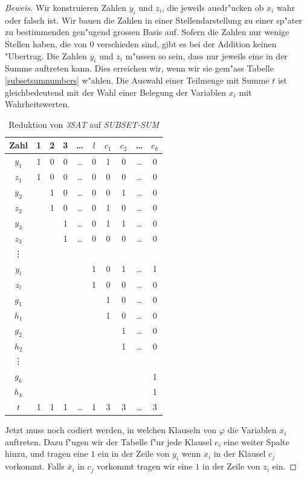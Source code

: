 \begin{proof}[Beweis]
Wir konstruieren Zahlen $y_i$ und $z_i$, die jeweils ausdr"ucken
ob $x_i$ wahr oder falsch ist. Wir bauen die Zahlen in einer
Stellendarstellung zu einer sp"ater zu bestimmenden gen"ugend
grossen Basis auf. Sofern die Zahlen nur wenige Stellen haben, die 
von $0$ verschieden sind, gibt es bei der Addition keinen "Ubertrag.
Die Zahlen $y_i$ und $z_i$ m"ussen so sein, dass nur jeweils eine
in der Summe auftreten kann. Dies erreichen wir, wenn wir
sie gem"ass Tabelle \ref{subsetsumnumbers} w"ahlen.
Die Auswahl einer Teilmenge mit Summe $t$ ist gleichbedeutend
mit der Wahl einer Belegung der Variablen $x_i$ mit Wahrheitswerten.
\begin{table}
\begin{center}
\begin{tabular}{|c|ccccc|cccc|}
\hline
Zahl&1&2&3&\dots&$l$&$c_1$&$c_2$&\dots&$c_k$\\
\hline
$y_1$&1&0&0&\dots&0&1&0&\dots&0\\
$z_1$&1&0&0&\dots&0&0&0&\dots&0\\
$y_2$& &1&0&\dots&0&0&1&\dots&0\\
$z_2$& &1&0&\dots&0&1&0&\dots&0\\
$y_3$& & &1&\dots&0&1&1&\dots&0\\
$z_3$& & &1&\dots&0&0&0&\dots&0\\
\vdots&& & &     & & & &     & \\
$y_l$& & & &     &1&0&1&\dots&1\\
$z_l$& & & &     &1&0&0&\dots&0\\
\hline
$g_1$& & & &     & &1&0&\dots&0\\
$h_1$& & & &     & &1&0&\dots&0\\
$g_2$& & & &     & & &1&\dots&0\\
$h_2$& & & &     & & &1&\dots&0\\
\vdots&& & &     & & & &     & \\
$g_k$& & & &     & & & &     &1\\
$h_k$& & & &     & & & &     &1\\
\hline
$t$  &1&1&1&\dots&1&3&3&\dots&3\\
\hline
\end{tabular}
\end{center}
\caption{Reduktion von \textsl{3SAT} auf
\textsl{SUBSET-SUM}\label{subsetsumtable}}
\end{table}

Jetzt muss noch codiert werden, in welchen Klauseln von $\varphi$ 
die Variablen $x_i$ auftreten. Dazu f"ugen wir der Tabelle f"ur jede
Klausel $c_i$ eine weiter Spalte hinzu, und tragen eine $1$ ein
in der Zeile von $y_i$ wenn $x_i$ in der Klausel $c_j$ vorkommt.
Falls $\bar x_i$ in $c_j$ vorkommt tragen wir eine $1$ in der Zeile
von $z_i$ ein.


\end{proof}
